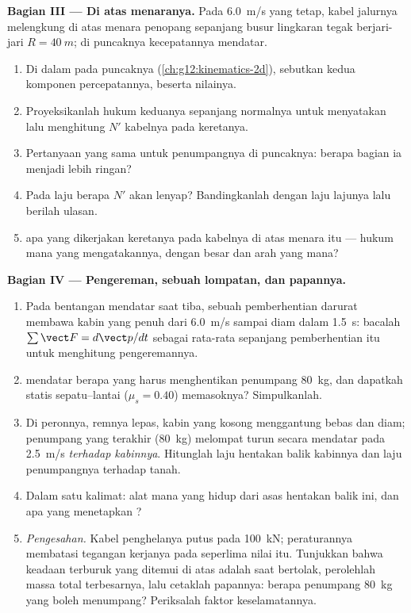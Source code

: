 \begin{problem}
\medskip
\noindent\textbf{Bagian III --- Di atas menaranya.} Pada \qty{6.0}{m/s} yang tetap,
kabel jalurnya melengkung di atas menara penopang sepanjang busur lingkaran tegak
berjari-jari $R = \qty{40}{m}$; di puncaknya kecepatannya mendatar.
\begin{enumerate}[resume]
  \item Di dalam  pada puncaknya (\cref{ch:g12:kinematics-2d}),
        sebutkan kedua komponen percepatannya, beserta nilainya.
  \item Proyeksikanlah hukum keduanya sepanjang normalnya untuk menyatakan lalu
        menghitung  $N'$ kabelnya pada keretanya.
  \item Pertanyaan yang sama untuk  penumpangnya di puncaknya: berapa bagian
        ia menjadi lebih ringan?
  \item Pada laju berapa $N'$ akan lenyap? Bandingkanlah dengan laju lajunya lalu
        berilah ulasan.
  \item {} apa yang dikerjakan keretanya pada kabelnya di atas menara itu --- hukum
        mana yang mengatakannya, dengan besar dan arah yang mana?
\end{enumerate}

\medskip
\noindent\textbf{Bagian IV --- Pengereman, sebuah lompatan, dan papannya.}
\begin{enumerate}[resume]
  \item Pada bentangan mendatar saat tiba, sebuah pemberhentian darurat membawa kabin
        yang penuh dari \qty{6.0}{m/s} sampai diam dalam \qty{1.5}{s}: bacalah
        $\sum \vect F = d\vect p/dt$ sebagai rata-rata sepanjang pemberhentian itu
        untuk menghitung  pengeremannya.
  \item {} mendatar berapa yang harus menghentikan penumpang \qty{80}{kg}, dan
        dapatkah  statis sepatu--lantai ($\mu_s = 0.40$) memasoknya?
        Simpulkanlah.
  \item Di peronnya, remnya lepas, kabin yang kosong menggantung bebas dan diam;
        penumpang yang terakhir (\qty{80}{kg}) melompat turun secara mendatar pada
        \qty{2.5}{m/s} \emph{terhadap kabinnya}. Hitunglah laju hentakan balik
        kabinnya dan laju penumpangnya terhadap tanah.
  \item Dalam satu kalimat: alat  mana yang hidup dari asas hentakan balik
        ini, dan apa yang menetapkan ?
  \item \emph{Pengesahan.} Kabel penghelanya putus pada \qty{100}{kN}; peraturannya
        membatasi tegangan kerjanya pada seperlima nilai itu. Tunjukkan bahwa keadaan
        terburuk yang ditemui di atas adalah saat bertolak, perolehlah massa total
        terbesarnya, lalu cetaklah papannya: berapa penumpang \qty{80}{kg} yang boleh
        menumpang? Periksalah faktor keselamatannya.
\end{enumerate}
\end{problem}

